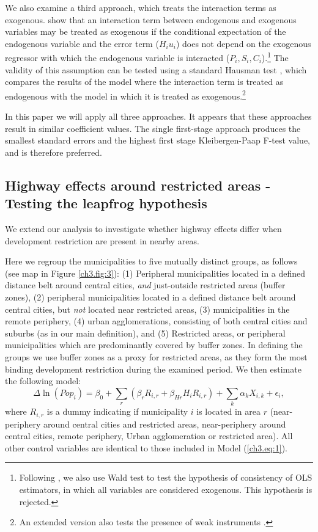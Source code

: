 \documentclass[a4paper,authoryear,review]{elsarticle}  	%
\begin{document}
	We also examine a third approach, which treats the interaction terms as exogenous. \citet{bun2018ols} show that an interaction term between endogenous and exogenous variables may be treated as exogenous if the conditional expectation of the endogenous variable and the error term ($H_{i}u_i$) does not depend on the exogenous regressor with which the endogenous variable is interacted ($P_i,S_i,C_i$).\footnote{Following \citet{bun2018ols}, we also use Wald test to test the hypothesis of consistency of OLS estimators, in which all variables are considered exogenous. This hypothesis is rejected.} The validity of this assumption can be tested using a standard Hausman test \citep{Hausman1978s}, which compares the results of the model where the interaction term is treated as endogenous with the model in which it is treated as exogenous.\footnote{An extended version also tests the presence of weak instruments \citep{bun2018ols,Hahn2011}.} 
	
	In this paper we will apply all three approaches. It appears that these approaches result in similar coefficient values. The single first-stage approach produces the smallest standard errors and the highest first stage Kleibergen-Paap F-test value, and is therefore preferred. 
	
\subsection{Highway effects around restricted areas - Testing the leapfrog hypothesis}\label{sec:method.belt}
	We extend our analysis to investigate whether highway effects differ when development restriction are present in nearby areas. 
	
	Here we regroup the municipalities to five mutually distinct groups, as follows (see map in Figure \ref{ch3.fig:3}): (1) Peripheral municipalities located in a defined distance belt around central cities, \emph{and} just-outside restricted areas (buffer zones), (2) peripheral municipalities located in a defined distance belt around central cities, but \emph{not} located near restricted areas, (3) municipalities in the remote periphery, (4) urban agglomerations, consisting of both central cities and suburbs (as in our main definition), and (5) Restricted areas, or peripheral municipalities which are predominantly covered by buffer zones. In defining the groups we use buffer zones as a proxy for restricted areas, as they form the most binding development restriction during the examined period. We then estimate the following model: 	
	\begin{equation}\label{ch3.eq:3}
		\Delta\ln(Pop_i) = \beta_0+ \sum_{r}(\beta_{r}R_{i,r} + \beta_{Hr}H_{i}R_{i,r}) + \sum_{k}\alpha_{k} X_{i,k} + \epsilon_i ,
	\end{equation}
	where $R_{i,r}$	is a dummy indicating if municipality $i$ is located in area $r$ (near-periphery around central cities and restricted areas, near-periphery around central cities, remote periphery, Urban agglomeration or restricted area). All other control variables are identical to those included in Model (\ref{ch3.eq:1}).	
\end{document}
